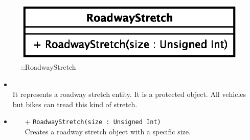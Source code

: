\begin{figure}[h]
\centering
\includegraphics[scale=0.6,keepaspectratio]{images/solution/app/backend/roadway_stretch.eps}
\caption{\pReactiveComponentStretch::RoadwayStretch}
\label{fig:sd-app-roadway_stretch}
\end{figure}
\FloatBarrier
\begin{itemize}
  \item \textbf{\descr} \\
    It represents a roadway stretch entity. It is a protected object. All
    vehicles but bikes can tread this kind of stretch.
    \item \textbf{\ops}
  \begin{itemize}
    \item[+] \texttt{RoadwayStretch(size : Unsigned Int)} \\
        Creates a roadway stretch object with a specific size.
  \end{itemize}
\end{itemize}
